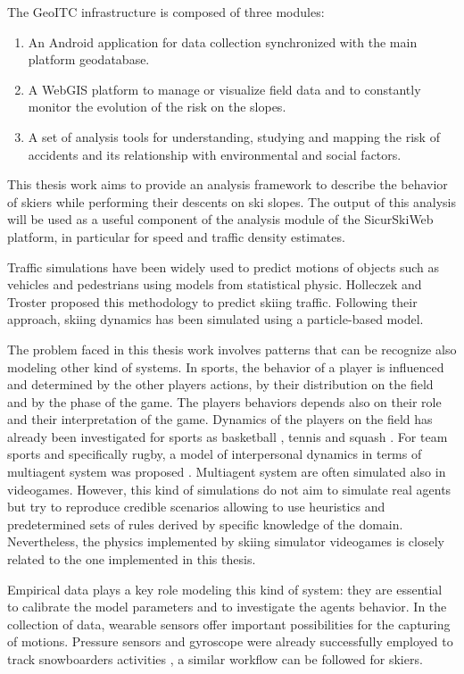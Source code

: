 \documentclass[12pt,a4paper,twoside]{book}
\begin{document}
The GeoITC infrastructure is composed of three modules:
\begin{enumerate}
\item An Android application for data collection synchronized with the main platform geodatabase.
\item A WebGIS platform to manage or visualize field data and to constantly monitor the evolution of the risk on the slopes.
\item A set of analysis tools for understanding, studying and mapping the risk of accidents and its relationship with environmental and social factors.
\end{enumerate}
This thesis work aims to provide an analysis framework to describe the behavior of skiers while performing their descents on ski slopes. The output of this analysis will be used as a useful component of the analysis module of the SicurSkiWeb platform, in particular for speed and traffic density estimates.

Traffic simulations have been widely used to predict motions of objects such as vehicles and pedestrians using models from statistical physic. Holleczek and Troster proposed this methodology to predict skiing traffic. Following their approach, skiing dynamics has been simulated using a particle-based model.

The problem faced in this thesis work involves patterns that can be recognize also modeling other kind of systems. In sports, the behavior of a player is influenced and determined by the other players actions, by their distribution on the field and by the phase of the game. The players behaviors depends also on their role and their interpretation of the game. Dynamics of the players on the field has already been investigated for sports as basketball \cite{bo2010}, tennis \cite{pa2005} and squash \cite{mc2006}. For team sports and specifically rugby, a model of interpersonal dynamics in terms of multiagent system was proposed \cite{qu2009}. Multiagent system are often simulated also in videogames. However, this kind of simulations do not aim to simulate real agents but try to reproduce credible scenarios allowing to use heuristics and predetermined sets of rules derived by specific knowledge of the domain. Nevertheless, the physics implemented by skiing simulator videogames is closely related to the one implemented in this thesis.

Empirical data plays a key role modeling this kind of system: they are essential to calibrate the model parameters and to investigate the agents behavior. In the collection of data, wearable sensors offer important possibilities for the capturing of motions. Pressure sensors and gyroscope were already successfully employed to track snowboarders activities \cite{hol2010}, a similar workflow can be followed for skiers.
\end{document}
